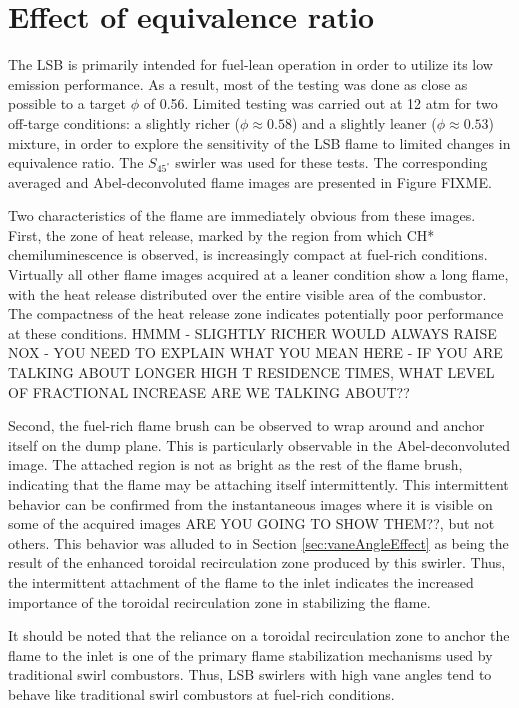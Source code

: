 \section{Effect of equivalence ratio}
\label{sec:eqRatioEffect}

The LSB is primarily intended for fuel-lean operation in order to utilize its low  emission performance.
As a result, most of the testing was done as close as possible to a target \(\phi\) of 0.56.
Limited testing was carried out at 12 atm for two off-targe conditions: a slightly richer (\(\phi \approx 0.58\)) and a slightly leaner (\(\phi \approx 0.53\)) mixture, in order to explore the sensitivity of the LSB flame to limited changes in equivalence ratio.
The \(S_{45^\circ}\) swirler was used for these tests.
The corresponding averaged and Abel-deconvoluted flame images are presented in Figure FIXME.

Two characteristics of the flame are immediately obvious from these images.
First, the zone of heat release, marked by the region from which CH* chemiluminescence is observed, is increasingly compact at fuel-rich conditions.
Virtually all other flame images acquired at a leaner condition show a long flame, with the heat release distributed over the entire visible area of the combustor.
The compactness of the heat release zone indicates potentially poor  performance at these conditions. HMMM - SLIGHTLY RICHER WOULD ALWAYS RAISE NOX - YOU NEED TO EXPLAIN WHAT YOU MEAN HERE - IF YOU ARE TALKING ABOUT LONGER HIGH T RESIDENCE TIMES, WHAT LEVEL OF FRACTIONAL INCREASE ARE WE TALKING ABOUT??

Second, the fuel-rich flame brush can be observed to wrap around and anchor itself on the dump plane.
This is particularly observable in the Abel-deconvoluted image.
The attached region is not as bright as the rest of the flame brush, indicating that the flame may be attaching itself intermittently.
This intermittent behavior can be confirmed from the instantaneous images where it is visible on some of the acquired images ARE YOU GOING TO SHOW THEM??, but not others.
This behavior was alluded to in Section \ref{sec:vaneAngleEffect} as being the result of the enhanced toroidal recirculation zone produced by this swirler.
Thus, the intermittent attachment of the flame to the inlet indicates the increased importance of the toroidal recirculation zone in stabilizing the flame.

It should be noted that the reliance on a toroidal recirculation zone to anchor the flame to the inlet is one of the primary flame stabilization mechanisms used by traditional swirl combustors.
Thus, LSB swirlers with high vane angles tend to behave like traditional swirl combustors at fuel-rich conditions.

